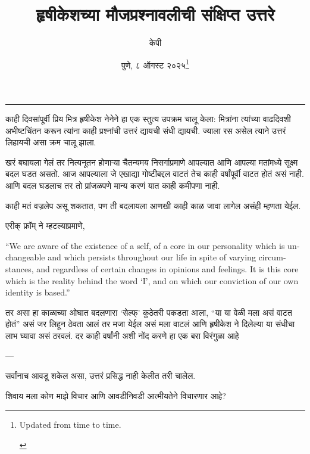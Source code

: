 \documentclass[17pt]{extarticle}  %
\newcommand{\attrib}[1]{%
\nopagebreak{\raggedleft\footnotesize #1\par}}
\begin{document}
\title{हृषीकेशच्या मौजप्रश्नावलीची संक्षिप्त उत्तरे}
\author{केपी}
\date{पुणे, ८ ऑगस्ट २०२५\footnote{\begin{english}Updated from time to time.\end{english}}}
\maketitle
\vspace{5mm}
\hrule

\lettrine[lines=3]{का}{ही} दिवसांपूर्वी प्रिय मित्र हृषीकेश नेनेने हा एक स्तुत्य उपक्रम चालू केला: मित्रांना त्यांच्या वाढदिवशी अभीष्टचिंतन करून त्यांना काही प्रश्नांची उत्तरं द्यायची संधी द्यायची. ज्याला रस असेल त्याने उत्तरं लिहायची असा क्रम चालू झाला. 

खरं बघायला गेलं तर नित्यनूतन होणाऱ्या चैतन्यमय निसर्गाप्रमाणे आपल्यात आणि आपल्या मतांमध्ये सूक्ष्म बदल घडत असतो. आज आपल्याला जे एखाद्या गोष्टीबद्दल वाटतं तेच काही वर्षांपूर्वी वाटत होतं असं नाही. आणि बदल घडलाच तर तो प्रांजळपणे मान्य करणं  यात काही कमीपणा नाही.

काही मतं वज्रलेप असू शकतात, पण ती बदलायला आणखी काही काळ जावा लागेल असंही म्हणता येईल. 

एरीक् फ्रॉम् ने म्हटल्याप्रमाणे, 

\begin{english}

\begin{displayquote}

\enquote{We are aware of the existence of a self, of a core in our personality which is unchangeable and which persists throughout our life in spite of varying circumstances, and regardless of certain changes in opinions and feelings. It is this core which is the reality behind the word `I', and on which our conviction of our own identity is based.}
\end{displayquote}
\attrib{\textit{Eric Fromm}, The Art of Loving}
\end{english}


तर असा हा काळाच्या ओघात बदलणारा \enquote*{सेल्फ्} कुठेतरी पकडता आला, \enquote{या या वेळी मला असं वाटत होतं} असं जर लिहून ठेवता आलं तर मजा येईल असं मला वाटलं आणि हृषीकेश ने दिलेल्या या संधीचा लाभ घ्यावा असं ठरवलं. दर काही वर्षांनी अशी नोंद करणे हा एक बरा विरंगुळा आहे\begin{english}---\end{english}सर्वांनाच आवडू शकेल असा, उत्तरं प्रसिद्ध नाही केलीत तरी चालेल. 

शिवाय मला कोण माझे विचार आणि आवडीनिवडी आत्मीयतेने विचारणार आहे?
\end{document}
